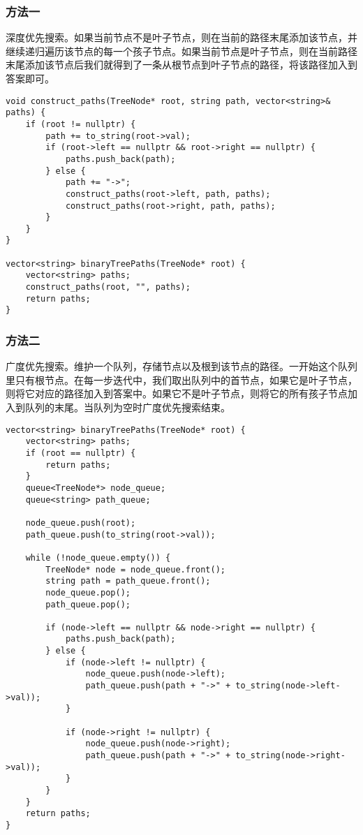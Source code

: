 \documentclass[lang=cn,10pt]{elegantbook}
\begin{document}
\subsubsection*{方法一}

深度优先搜索。如果当前节点不是叶子节点，则在当前的路径末尾添加该节点，并继续递归遍历该节点的每一个孩子节点。如果当前节点是叶子节点，则在当前路径末尾添加该节点后我们就得到了一条从根节点到叶子节点的路径，将该路径加入到答案即可。

\begin{lstlisting}
void construct_paths(TreeNode* root, string path, vector<string>& paths) {
	if (root != nullptr) {
		path += to_string(root->val);
		if (root->left == nullptr && root->right == nullptr) {
			paths.push_back(path);
		} else {
			path += "->";
			construct_paths(root->left, path, paths);
			construct_paths(root->right, path, paths);
		}
	}
}

vector<string> binaryTreePaths(TreeNode* root) {
	vector<string> paths;
	construct_paths(root, "", paths);
	return paths;
}
\end{lstlisting}

\subsubsection*{方法二}

广度优先搜索。维护一个队列，存储节点以及根到该节点的路径。一开始这个队列里只有根节点。在每一步迭代中，我们取出队列中的首节点，如果它是叶子节点，则将它对应的路径加入到答案中。如果它不是叶子节点，则将它的所有孩子节点加入到队列的末尾。当队列为空时广度优先搜索结束。

\begin{lstlisting}
vector<string> binaryTreePaths(TreeNode* root) {
	vector<string> paths;
	if (root == nullptr) {
		return paths;
	}
	queue<TreeNode*> node_queue;
	queue<string> path_queue;
	
	node_queue.push(root);
	path_queue.push(to_string(root->val));
	
	while (!node_queue.empty()) {
		TreeNode* node = node_queue.front(); 
		string path = path_queue.front();
		node_queue.pop();
		path_queue.pop();
		
		if (node->left == nullptr && node->right == nullptr) {
			paths.push_back(path);
		} else {
			if (node->left != nullptr) {
				node_queue.push(node->left);
				path_queue.push(path + "->" + to_string(node->left->val));
			}
			
			if (node->right != nullptr) {
				node_queue.push(node->right);
				path_queue.push(path + "->" + to_string(node->right->val));
			}
		}
	}
	return paths;
}
\end{lstlisting}
\end{document}
